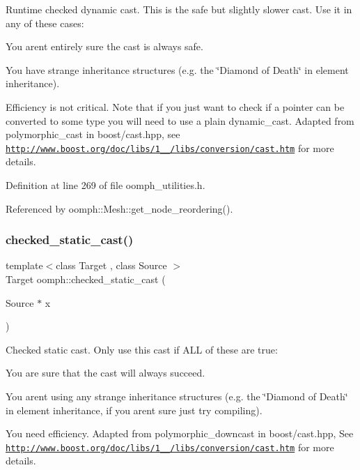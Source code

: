 Runtime checked dynamic cast. This is the safe but slightly slower cast. Use it in any of these cases\+: 


\begin{DoxyItemize}
\item You aren\textquotesingle{}t entirely sure the cast is always safe.
\item You have strange inheritance structures (e.\+g. the \char`\"{}\+Diamond of Death\char`\"{} in element inheritance).
\item Efficiency is not critical. Note that if you just want to check if a pointer can be converted to some type you will need to use a plain dynamic\+\_\+cast. Adapted from polymorphic\+\_\+cast in boost/cast.\+hpp, see \href{http://www.boost.org/doc/libs/1_52_0/libs/conversion/cast.htm}{\tt http\+://www.\+boost.\+org/doc/libs/1\+\_\+\_/libs/conversion/cast.\+htm} for more details. 
\end{DoxyItemize}

Definition at line 269 of file oomph\+\_\+utilities.\+h.



Referenced by oomph\+::\+Mesh\+::get\+\_\+node\+\_\+reordering().

\mbox{\label{namespaceoomph_a2dfa740f37368b226f0c0ced9cafe284}} 
\subsubsection{\texorpdfstring{checked\+\_\+static\+\_\+cast()}{checked\_static\_cast()}}
{\footnotesize\ttfamily template$<$class Target , class Source $>$ \\
Target oomph\+::checked\+\_\+static\+\_\+cast (\begin{DoxyParamCaption}\item[{Source $\ast$}]{x }\end{DoxyParamCaption})\hspace{0.3cm}{\ttfamily [inline]}}



Checked static cast. Only use this cast if A\+LL of these are true\+: 


\begin{DoxyItemize}
\item You are sure that the cast will always succeed.
\item You aren\textquotesingle{}t using any strange inheritance structures (e.\+g. the \char`\"{}\+Diamond of
\+Death\char`\"{} in element inheritance, if you aren\textquotesingle{}t sure just try compiling).
\item You need efficiency. Adapted from polymorphic\+\_\+downcast in boost/cast.\+hpp, See \href{http://www.boost.org/doc/libs/1_52_0/libs/conversion/cast.htm}{\tt http\+://www.\+boost.\+org/doc/libs/1\+\_\+\_/libs/conversion/cast.\+htm} for more details. 
\end{DoxyItemize}

